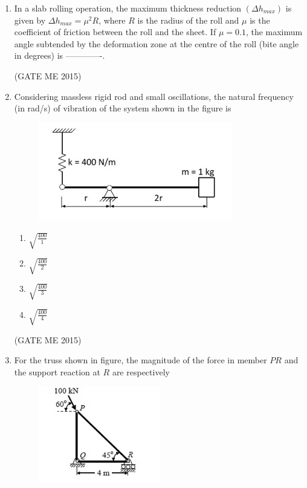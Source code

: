 \documentclass[journal]{IEEEtran}
\begin{document}
\begin{enumerate}
\item In a slab rolling operation, the maximum thickness reduction $ (\Delta h_{max}) $ is given by $ \Delta h_{max} = \mu^2 R $, where $ R $ is the radius of the roll and $ \mu $ is the coefficient of friction between the roll and the sheet. If $ \mu = 0.1 $, the maximum angle subtended by the deformation zone at the centre of the roll (bite angle in degrees) is -------------.

\hfill  (GATE ME 2015)

\item Considering massless rigid rod and small oscillations, the natural frequency (in rad/s) of vibration of the system shown in the figure is

\begin{figure}[H]
\centering
\includegraphics[width=0.8\textwidth]{Fig 15.png}
\caption{}
\label{fig:question48}
\end{figure}

\begin{multicols}{4}
\begin{enumerate}
    \item $\sqrt{\frac{400}{1}}$
    \item $\sqrt{\frac{400}{2}}$
    \item $\sqrt{\frac{400}{3}}$
    \item $\sqrt{\frac{400}{4}}$
\end{enumerate}
\end{multicols}
\hfill  (GATE ME 2015)

\item For the truss shown in figure, the magnitude of the force in member $ PR $ and the support reaction at $ R $ are respectively

\begin{figure}[H]
\centering
\includegraphics[width=0.5\textwidth]{Fig 16.png}
\caption{}
\label{fig:question49}
\end{figure}


\end{enumerate}
\end{document}
